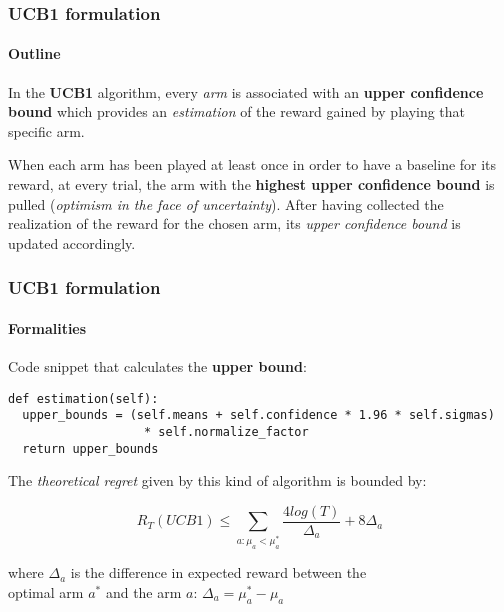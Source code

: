 
\begin{frame}

\frametitle{UCB1 formulation}
\framesubtitle{Outline}

In the \textbf{UCB1} algorithm, every \textit{arm} is associated with an \textbf{upper confidence bound} which provides an \textit{estimation} of the reward gained by playing that specific arm.

When each arm has been played at least once in order to have a baseline for its reward, at every trial, the arm with the \textbf{highest upper confidence bound} is pulled (\textit{optimism in the face of uncertainty}).
After having collected the realization of the reward for the chosen arm, its \textit{upper confidence bound} is updated accordingly.

\end{frame}


\begin{frame}[fragile]

\frametitle{UCB1 formulation}
\framesubtitle{Formalities}

Code snippet that calculates the \textbf{upper bound}:

\begin{lstlisting}[style=Python, basicstyle=\tiny, numbers=none, framexrightmargin=-20pt]
def estimation(self):
  upper_bounds = (self.means + self.confidence * 1.96 * self.sigmas)
                   * self.normalize_factor
  return upper_bounds
\end{lstlisting}


The \textit{theoretical regret} given by this kind of algorithm is bounded by:

\begin{displaymath}
    R_T(UCB1) \le \sum_{a:\mu_a < \mu_a^*} \frac{4log(T)}{\Delta_a} + 8\Delta_a
\end{displaymath}

where $\Delta_a$ is the difference in expected reward between the \\ optimal arm $a^*$ and the arm $a$: $\Delta_a = \mu_a^* - \mu_a$

\end{frame}


